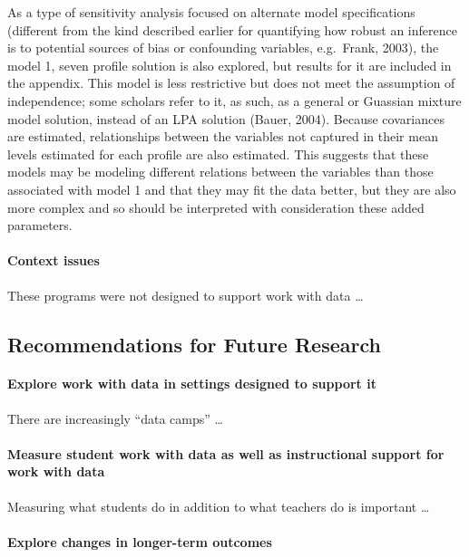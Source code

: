\documentclass[]{book}
\let\oldparagraph\paragraph
\renewcommand{\paragraph}[1]{\oldparagraph{#1}\mbox{}}
\theoremstyle{definition}
\theoremstyle{definition}
\theoremstyle{definition}
\theoremstyle{remark}
\begin{document}
As a type of sensitivity analysis focused on alternate model
specifications (different from the kind described earlier for
quantifying how robust an inference is to potential sources of bias or
confounding variables, e.g.~Frank, 2003), the model 1, seven profile
solution is also explored, but results for it are included in the
appendix. This model is less restrictive but does not meet the
assumption of independence; some scholars refer to it, as such, as a
general or Guassian mixture model solution, instead of an LPA solution
(Bauer, 2004). Because covariances are estimated, relationships between
the variables not captured in their mean levels estimated for each
profile are also estimated. This suggests that these models may be
modeling different relations between the variables than those associated
with model 1 and that they may fit the data better, but they are also
more complex and so should be interpreted with consideration these added
parameters.

\paragraph{Context issues}\label{context-issues}

These programs were not designed to support work with data \ldots{}

\subsection{Recommendations for Future
Research}\label{recommendations-for-future-research}

\paragraph{Explore work with data in settings designed to support
it}\label{explore-work-with-data-in-settings-designed-to-support-it}

There are increasingly ``data camps'' \ldots{}

\paragraph{Measure student work with data as well as instructional
support for work with
data}\label{measure-student-work-with-data-as-well-as-instructional-support-for-work-with-data}

Measuring what students do in addition to what teachers do is important
\ldots{}

\paragraph{Explore changes in longer-term
outcomes}\label{explore-changes-in-longer-term-outcomes}
\end{document}
